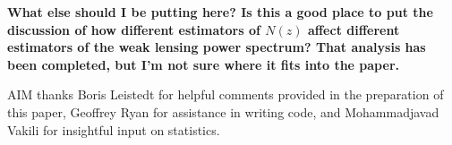 \documentclass[preprint]{aastex}
\begin{document}
\textbf{What else should I be putting here?  Is this a good place to put the 
discussion of how different estimators of $N(z)$ affect different estimators of 
the weak lensing power spectrum?  That analysis has been completed, but I'm not 
sure where it fits into the paper.}


\begin{acknowledgements}
AIM thanks Boris Leistedt for helpful comments provided in the preparation of 
this paper, Geoffrey Ryan for assistance in writing code, and Mohammadjavad 
Vakili for insightful input on statistics.
\end{acknowledgements}



\end{document}
